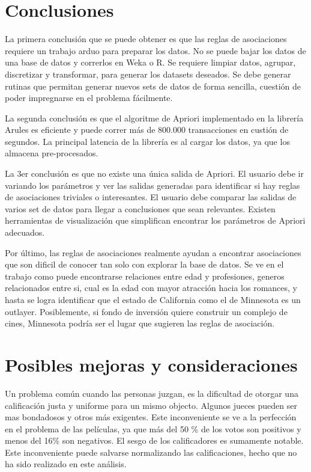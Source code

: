 \documentclass[journal]{IEEEtran}
\begin{document}
\section{Conclusiones}
La primera conclusión que se puede obtener es que las reglas de asociaciones requiere
un trabajo arduo para preparar los datos. No se puede bajar los datos de una base de datos
y correrlos en Weka o R. Se requiere limpiar datos, agrupar, discretizar y transformar, 
para generar los datasets deseados. Se debe generar rutinas que permitan generar nuevos
sets de datos de forma sencilla, cuestión de poder impregnarse en el problema fácilmente.

La segunda conclusión es que el algoritme de Apriori implementado en la librería Arules
es eficiente y puede correr más de 800.000 transacciones en custión de segundos. La principal
latencia de la librería es al cargar los datos, ya que los almacena pre-procesados.

La 3er conclusión es que no existe una única salida de Apriori. El usuario debe ir variando
los parámetros y ver las salidas generadas para identificar si hay reglas de asociaciones
triviales o interesantes. El usuario debe comparar las salidas de varios set de datos para
llegar a conclusiones que sean relevantes. Existen herramientas de visualización que simplifican
encontrar los parámetros de Apriori adecuados.

Por último, las reglas de asociaciones realmente ayudan a encontrar asociaciones
que son dificil de conocer tan solo con explorar la base de datos. Se ve en el trabajo
como puede encontrarse relaciones entre edad y profesiones, generos relacionados entre si,
cual es la edad con mayor atracción hacia los romances, y hasta se logra identificar
que el estado de California como el de Minnesota es un outlayer. Posiblemente, si 
fondo de inversión quiere construir un complejo de cines, Minnesota podría ser el 
lugar que sugieren las reglas de asociación.

\section{Posibles mejoras y consideraciones}

Un problema común cuando las personas juzgan, es la dificultad de otorgar una
calificación justa y uniforme para un mismo objecto. Algunos jueces pueden ser
mas bondadosos y otros más exigentes. Este inconveniente se ve a la perfección
en el problema de las películas, ya que más del 50 \% de los votos son positivos
y menos del 16\% son negativos. El sesgo de los calificadores es sumamente notable.
Este inconveniente puede salvarse normalizando las calificaciones, hecho que no
ha sido realizado en este análisis.
\end{document}

